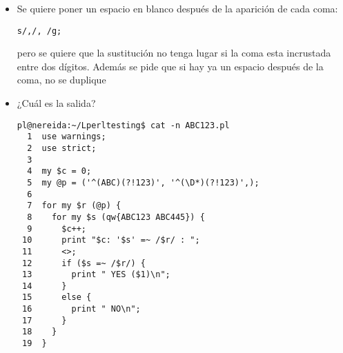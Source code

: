 \begin{exercise}
\begin{itemize}
\item
Se quiere poner un espacio en blanco después de la aparición de cada coma:
\begin{verbatim}
s/,/, /g;
\end{verbatim}
pero se quiere que la sustitución no tenga lugar si la coma esta incrustada entre
dos dígitos. Además se pide que si hay ya un espacio después de la coma,
no se duplique






\item
¿Cuál es la salida?
\begin{latexonly}
\begin{verbatim}
pl@nereida:~/Lperltesting$ cat -n ABC123.pl
  1  use warnings;
  2  use strict;
  3
  4  my $c = 0;
  5  my @p = ('^(ABC)(?!123)', '^(\D*)(?!123)',);
  6
  7  for my $r (@p) {
  8    for my $s (qw{ABC123 ABC445}) {
  9      $c++;
 10      print "$c: '$s' =~ /$r/ : ";
 11      <>;
 12      if ($s =~ /$r/) {
 13        print " YES ($1)\n";
 14      }
 15      else {
 16        print " NO\n";
 17      }
 18    }
 19  }
\end{verbatim}
\end{latexonly}
\begin{verbatim}


\end{verbatim}
\end{itemize}
\end{exercise}

